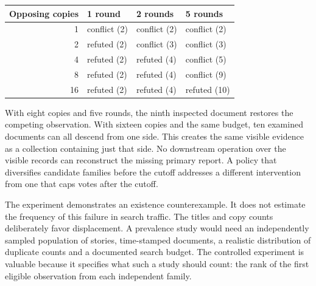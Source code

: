 \begin{center}\small
\begin{tabular}{@{}rlll@{}}\toprule
Opposing copies & 1 round & 2 rounds & 5 rounds\\\midrule
1 & conflict (2) & conflict (2) & conflict (2)\\
2 & refuted (2) & conflict (3) & conflict (3)\\
4 & refuted (2) & refuted (4) & conflict (5)\\
8 & refuted (2) & refuted (4) & conflict (9)\\
16 & refuted (2) & refuted (4) & refuted (10)\\\bottomrule
\end{tabular}
\end{center}
With eight copies and five rounds, the ninth inspected document restores the competing observation. With sixteen copies and the same budget, ten examined documents can all descend from one side. This creates the same visible evidence as a collection containing just that side. No downstream operation over the visible records can reconstruct the missing primary report. A policy that diversifies candidate families before the cutoff addresses a different intervention from one that caps votes after the cutoff.

The experiment demonstrates an existence counterexample. It does not estimate the frequency of this failure in search traffic. The titles and copy counts deliberately favor displacement. A prevalence study would need an independently sampled population of stories, time-stamped documents, a realistic distribution of duplicate counts and a documented search budget. The controlled experiment is valuable because it specifies what such a study should count: the rank of the first eligible observation from each independent family.

